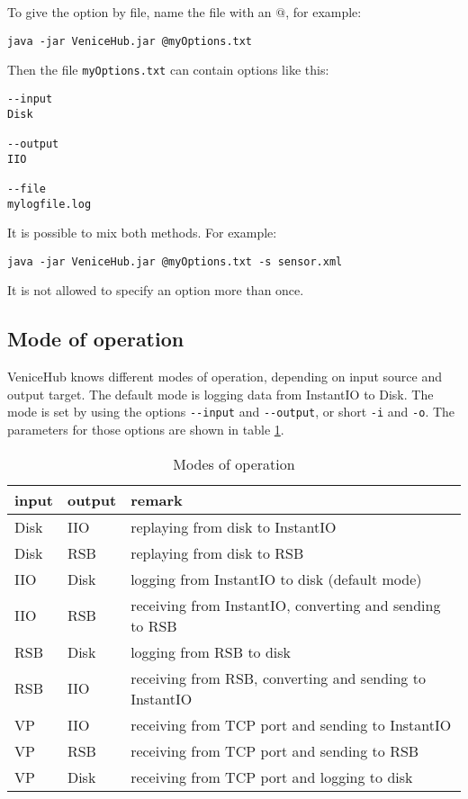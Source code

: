 \documentclass[german,a4paper]{article}
\begin{document}
To give the option by file, name the file with an $@$, for example:
\begin{lstlisting}
java -jar VeniceHub.jar @myOptions.txt
\end{lstlisting}
Then the file \texttt{myOptions.txt} can contain options like this:
\begin{lstlisting}
--input
Disk

--output
IIO

--file
mylogfile.log
\end{lstlisting}

It is possible to mix both methods. For example:
\begin{lstlisting}
java -jar VeniceHub.jar @myOptions.txt -s sensor.xml
\end{lstlisting}
It is not allowed to specify an option more than once.\\

\subsection{Mode of operation}
VeniceHub knows different modes of operation, depending on input source and output target. The default mode is logging data from InstantIO to Disk. The mode is set by using the options \texttt{-\--input} and \texttt{-\--output}, or short \texttt{-i} and \texttt{-o}. The parameters for those options are shown in table \ref{tab_modes}.

\begin{table}[htbp]
\centering
\begin{tabular}{lll}
input       &  output  & remark \\
\hline
Disk  & IIO  & replaying from disk to InstantIO \\
Disk  & RSB   & replaying from disk to RSB\\
IIO  & Disk    & logging from InstantIO to disk (default mode) \\
IIO   & RSB   & receiving from InstantIO, converting and sending to RSB\\
RSB   & Disk  & logging from RSB to disk\\
RSB   &  IIO  & receiving from RSB, converting and sending to InstantIO\\
VP & IIO & receiving from TCP port and sending to InstantIO\\
VP & RSB & receiving from TCP port and sending to RSB\\
VP & Disk & receiving from TCP port and logging to disk
\end{tabular}
\caption{Modes of operation}
\label{tab_modes}
\end{table} 
\end{document}
